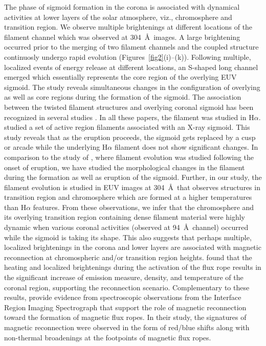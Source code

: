 \documentclass[twocolumn]{aastex6}
\begin{document}
{The phase of sigmoid formation in the corona is associated with dynamical activities at lower layers of the solar atmosphere, viz., chromosphere and transition region. We observe multiple brightenings at different locations of the  filament channel which was observed at 304~\AA~images. A large brightening occurred prior to the merging of two filament channels and the coupled structure continuosly undergo rapid evolution (Figures~\ref{fig2}(i)--(k)). Following multiple, localized events of energy release at different locations, an S-shaped long channel emerged which essentially represents the core region of the overlying EUV sigmoid. The study reveals simultaneous changes in the configuration of overlying as well as core regions during the formation of the sigmoid. The association between the twisted filament structures and overlying coronal sigmoid has been recognized in several studies \citep{Pevtsov1996,Gibson2000,Gibson2002,Pevtsov2002}. In all these papers, the filament was studied in H$\alpha$. \cite{Pevtsov2002} studied a set of active region filaments associated with an X-ray sigmoid. This study reveals that as the eruption proceeds, the sigmoid gets replaced  by a cusp or arcade while the underlying H$\alpha$ filament does not show significant changes. In comparison to the study of \cite{Pevtsov2002}, where filament evolution was studied following the onset of eruption, we have studied the morphological changes in the filament during the formation as well as eruption of the sigmoid. Further, in our study, the filament evolution is studied in EUV images at 304~\AA~that observes structures in transition region and chromosphere which are formed at a higher temperatures than H$\alpha$ features. From these observations, we infer that the chromosphere and its overlying transition region containing dense filament material were highly dynamic when various coronal activities (observed at 94~\AA~channel) occurred while the  sigmoid is taking its shape.
This also suggests that perhaps multiple, localized brightenings in the corona and lower layers are associated with magnetic reconnection at chromospheric and/or transition region heights. \cite{Vemareddy2014} found that the heating and localized brightenings during the activation of the flux rope results in the significant increase of emission measure, density, and temperature of the coronal region, supporting the reconnection scenario. Complementary to these results, \cite{Cheng2015_2MFR} provide evidence from spectroscopic observations from the Interface Region Imaging Spectrograph \citep[IRIS;][]{DePontieu2014} that support the role of magnetic reconnection toward the formation of magnetic flux ropes. In their study, the signatures of magnetic reconnection were observed in the form of red/blue shifts along with non-thermal broadenings at the footpoints of magnetic flux ropes.

}
\end{document}
